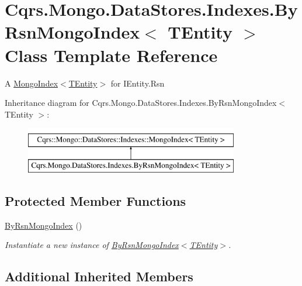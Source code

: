 \hypertarget{classCqrs_1_1Mongo_1_1DataStores_1_1Indexes_1_1ByRsnMongoIndex}{}\section{Cqrs.\+Mongo.\+Data\+Stores.\+Indexes.\+By\+Rsn\+Mongo\+Index$<$ T\+Entity $>$ Class Template Reference}
\label{classCqrs_1_1Mongo_1_1DataStores_1_1Indexes_1_1ByRsnMongoIndex}


A \hyperlink{classCqrs_1_1Mongo_1_1DataStores_1_1Indexes_1_1MongoIndex_a7affbb063520cd8c8bda27f8478efd06_a7affbb063520cd8c8bda27f8478efd06}{Mongo\+Index$<$\+T\+Entity$>$} for I\+Entity.\+Rsn  


Inheritance diagram for Cqrs.\+Mongo.\+Data\+Stores.\+Indexes.\+By\+Rsn\+Mongo\+Index$<$ T\+Entity $>$\+:\begin{figure}[H]
\begin{center}
\leavevmode
\includegraphics[height=2.000000cm]{classCqrs_1_1Mongo_1_1DataStores_1_1Indexes_1_1ByRsnMongoIndex}
\end{center}
\end{figure}
\subsection*{Protected Member Functions}
\begin{DoxyCompactItemize}
\item 
\hyperlink{classCqrs_1_1Mongo_1_1DataStores_1_1Indexes_1_1ByRsnMongoIndex_ae28ab1125093922dc3eeb3a19b821224_ae28ab1125093922dc3eeb3a19b821224}{By\+Rsn\+Mongo\+Index} ()
\begin{DoxyCompactList}\small\item\em Instantiate a new instance of \hyperlink{classCqrs_1_1Mongo_1_1DataStores_1_1Indexes_1_1ByRsnMongoIndex_ae28ab1125093922dc3eeb3a19b821224_ae28ab1125093922dc3eeb3a19b821224}{By\+Rsn\+Mongo\+Index$<$\+T\+Entity$>$}. \end{DoxyCompactList}\end{DoxyCompactItemize}
\subsection*{Additional Inherited Members}


